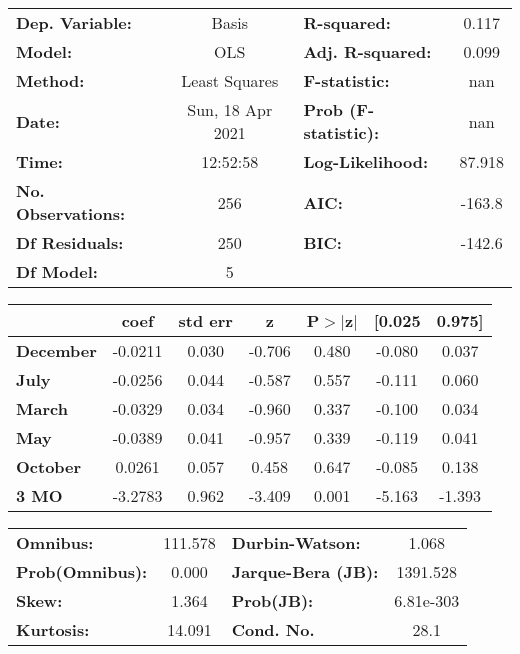 \begin{center}
\begin{tabular}{lclc}
\toprule
\textbf{Dep. Variable:}    &      Basis       & \textbf{  R-squared:         } &     0.117   \\
\textbf{Model:}            &       OLS        & \textbf{  Adj. R-squared:    } &     0.099   \\
\textbf{Method:}           &  Least Squares   & \textbf{  F-statistic:       } &       nan   \\
\textbf{Date:}             & Sun, 18 Apr 2021 & \textbf{  Prob (F-statistic):} &      nan    \\
\textbf{Time:}             &     12:52:58     & \textbf{  Log-Likelihood:    } &    87.918   \\
\textbf{No. Observations:} &         256      & \textbf{  AIC:               } &    -163.8   \\
\textbf{Df Residuals:}     &         250      & \textbf{  BIC:               } &    -142.6   \\
\textbf{Df Model:}         &           5      & \textbf{                     } &             \\
\bottomrule
\end{tabular}
\begin{tabular}{lcccccc}
                  & \textbf{coef} & \textbf{std err} & \textbf{z} & \textbf{P$> |$z$|$} & \textbf{[0.025} & \textbf{0.975]}  \\
\midrule
\textbf{December} &      -0.0211  &        0.030     &    -0.706  &         0.480        &       -0.080    &        0.037     \\
\textbf{July}     &      -0.0256  &        0.044     &    -0.587  &         0.557        &       -0.111    &        0.060     \\
\textbf{March}    &      -0.0329  &        0.034     &    -0.960  &         0.337        &       -0.100    &        0.034     \\
\textbf{May}      &      -0.0389  &        0.041     &    -0.957  &         0.339        &       -0.119    &        0.041     \\
\textbf{October}  &       0.0261  &        0.057     &     0.458  &         0.647        &       -0.085    &        0.138     \\
\textbf{3 MO}     &      -3.2783  &        0.962     &    -3.409  &         0.001        &       -5.163    &       -1.393     \\
\bottomrule
\end{tabular}
\begin{tabular}{lclc}
\textbf{Omnibus:}       & 111.578 & \textbf{  Durbin-Watson:     } &     1.068  \\
\textbf{Prob(Omnibus):} &   0.000 & \textbf{  Jarque-Bera (JB):  } &  1391.528  \\
\textbf{Skew:}          &   1.364 & \textbf{  Prob(JB):          } & 6.81e-303  \\
\textbf{Kurtosis:}      &  14.091 & \textbf{  Cond. No.          } &      28.1  \\
\bottomrule
\end{tabular}
\end{center}

